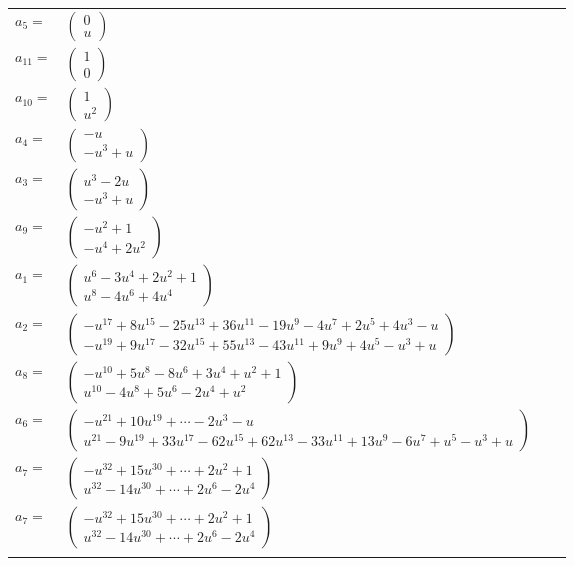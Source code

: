 \documentclass[1p]{elsarticle_modified}
\theoremstyle{definition}
\begin{document}
\begin{tabular}{m{7pt} m{180pt} m{7pt} m{180pt} }
\flushright $a_{5}=$&$\begin{pmatrix}0\\u\end{pmatrix}$ \\
\flushright $a_{11}=$&$\begin{pmatrix}1\\0\end{pmatrix}$ \\
\flushright $a_{10}=$&$\begin{pmatrix}1\\u^2\end{pmatrix}$ \\
\flushright $a_{4}=$&$\begin{pmatrix}- u\\- u^3+u\end{pmatrix}$ \\
\flushright $a_{3}=$&$\begin{pmatrix}u^3-2 u\\- u^3+u\end{pmatrix}$ \\
\flushright $a_{9}=$&$\begin{pmatrix}- u^2+1\\- u^4+2 u^2\end{pmatrix}$ \\
\flushright $a_{1}=$&$\begin{pmatrix}u^6-3 u^4+2 u^2+1\\u^8-4 u^6+4 u^4\end{pmatrix}$ \\
\flushright $a_{2}=$&$\begin{pmatrix}- u^{17}+8 u^{15}-25 u^{13}+36 u^{11}-19 u^9-4 u^7+2 u^5+4 u^3- u\\- u^{19}+9 u^{17}-32 u^{15}+55 u^{13}-43 u^{11}+9 u^9+4 u^5- u^3+u\end{pmatrix}$ \\
\flushright $a_{8}=$&$\begin{pmatrix}- u^{10}+5 u^8-8 u^6+3 u^4+u^2+1\\u^{10}-4 u^8+5 u^6-2 u^4+u^2\end{pmatrix}$ \\
\flushright $a_{6}=$&$\begin{pmatrix}- u^{21}+10 u^{19}+\cdots-2 u^3- u\\u^{21}-9 u^{19}+33 u^{17}-62 u^{15}+62 u^{13}-33 u^{11}+13 u^9-6 u^7+u^5- u^3+u\end{pmatrix}$ \\
\flushright $a_{7}=$&$\begin{pmatrix}- u^{32}+15 u^{30}+\cdots+2 u^2+1\\u^{32}-14 u^{30}+\cdots+2 u^6-2 u^4\end{pmatrix}$\\ \flushright $a_{7}=$&$\begin{pmatrix}- u^{32}+15 u^{30}+\cdots+2 u^2+1\\u^{32}-14 u^{30}+\cdots+2 u^6-2 u^4\end{pmatrix}$\\&\end{tabular}
\end{document}
